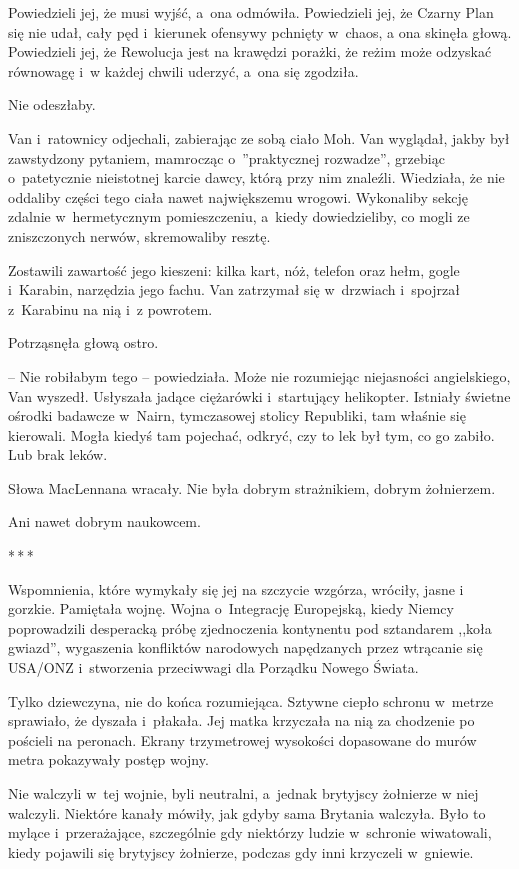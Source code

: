 \documentclass[oneside,polish,11pt,sfheadings]{mwbk}
\newcommand{\threeast}{\bigskip\par\centerline{*\,*\,*}\medskip\par}%
\begin{document}
Powiedzieli jej, że musi wyjść, a~ona odmówiła. Powiedzieli jej, że
Czarny Plan się nie udał, cały pęd i~kierunek ofensywy pchnięty w~chaos,
a ona skinęła głową. Powiedzieli jej, że Rewolucja jest na krawędzi
porażki, że reżim może odzyskać równowagę i~w każdej chwili uderzyć, a~ona się zgodziła.

Nie odeszłaby.

Van i~ratownicy odjechali, zabierając ze sobą ciało Moh. Van wyglądał,
jakby był zawstydzony pytaniem, mamrocząc o~''praktycznej rozwadze'',
grzebiąc o~patetycznie nieistotnej karcie dawcy, którą przy nim
znaleźli. Wiedziała, że nie oddaliby części tego ciała nawet
największemu wrogowi. Wykonaliby sekcję zdalnie w~hermetycznym
pomieszczeniu, a~kiedy dowiedzieliby, co mogli ze zniszczonych nerwów,
skremowaliby resztę.

Zostawili zawartość jego kieszeni: kilka kart, nóż, telefon oraz hełm,
gogle i~Karabin, narzędzia jego fachu. Van zatrzymał się w~drzwiach i~spojrzał z~Karabinu na nią i~z powrotem.

Potrząsnęła głową ostro. 

-- Nie robiłabym tego -- powiedziała. Może nie
rozumiejąc niejasności angielskiego, Van wyszedł. Usłyszała jadące
ciężarówki i~startujący helikopter. Istniały świetne ośrodki badawcze w~Nairn, tymczasowej stolicy Republiki, tam właśnie się kierowali. Mogła
kiedyś tam pojechać, odkryć, czy to lek był tym, co go zabiło. Lub brak
leków.

Słowa MacLennana wracały. Nie była dobrym strażnikiem, dobrym żołnierzem.

Ani nawet dobrym naukowcem.
  \threeast 

Wspomnienia, które wymykały się jej na szczycie wzgórza, wróciły, jasne
i gorzkie. Pamiętała wojnę. Wojna o~Integrację Europejską, kiedy Niemcy
poprowadzili desperacką próbę zjednoczenia kontynentu pod sztandarem
,,koła gwiazd'', wygaszenia konfliktów narodowych napędzanych przez
wtrącanie się USA/ONZ i~stworzenia przeciwwagi dla Porządku Nowego
Świata.

Tylko dziewczyna, nie do końca rozumiejąca. Sztywne ciepło schronu w~metrze sprawiało, że dyszała i~płakała. Jej matka krzyczała na nią za
chodzenie po pościeli na peronach. Ekrany trzymetrowej wysokości
dopasowane do murów metra pokazywały postęp wojny.

Nie walczyli w~tej wojnie, byli neutralni, a~jednak brytyjscy żołnierze
w niej walczyli. Niektóre kanały mówiły, jak gdyby sama Brytania
walczyła. Było to mylące i~przerażające, szczególnie gdy niektórzy
ludzie w~schronie wiwatowali, kiedy pojawili się brytyjscy żołnierze,
podczas gdy inni krzyczeli w~gniewie.
\end{document}
